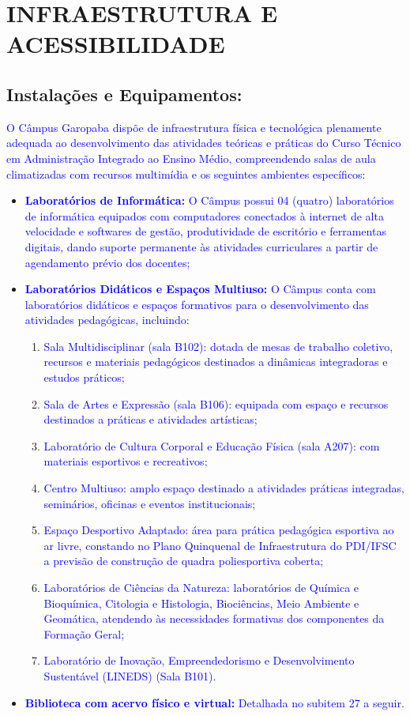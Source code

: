 \documentclass{../../modelos/latex-shared/ifsc-ppc}
\newcommand{\revisao}[1]{\textcolor{blue}{#1}}
\newcommand{\revisao}[1]{#1}
\begin{document}
\section{INFRAESTRUTURA E ACESSIBILIDADE}
\subsection{Instalações e Equipamentos:}
\revisao{O Câmpus Garopaba dispõe de infraestrutura física e tecnológica plenamente adequada ao desenvolvimento das atividades teóricas e práticas do Curso Técnico em Administração Integrado ao Ensino Médio, compreendendo salas de aula climatizadas com recursos multimídia e os seguintes ambientes específicos:}
\begin{itemize}
    \item \revisao{\textbf{Laboratórios de Informática:} O Câmpus possui 04 (quatro) laboratórios de informática equipados com computadores conectados à internet de alta velocidade e softwares de gestão, produtividade de escritório e ferramentas digitais, dando suporte permanente às atividades curriculares a partir de agendamento prévio dos docentes;}
    \item \revisao{\textbf{Laboratórios Didáticos e Espaços Multiuso:} O Câmpus conta com laboratórios didáticos e espaços formativos para o desenvolvimento das atividades pedagógicas, incluindo:}
    \begin{enumerate}
        \item \revisao{Sala Multidisciplinar (sala B102): dotada de mesas de trabalho coletivo, recursos e materiais pedagógicos destinados a dinâmicas integradoras e estudos práticos;}
        \item \revisao{Sala de Artes e Expressão (sala B106): equipada com espaço e recursos destinados a práticas e atividades artísticas;}
        \item \revisao{Laboratório de Cultura Corporal e Educação Física (sala A207): com materiais esportivos e recreativos;}
        \item \revisao{Centro Multiuso: amplo espaço destinado a atividades práticas integradas, seminários, oficinas e eventos institucionais;}
        \item \revisao{Espaço Desportivo Adaptado: área para prática pedagógica esportiva ao ar livre, constando no Plano Quinquenal de Infraestrutura do PDI/IFSC a previsão de construção de quadra poliesportiva coberta;}
        \item \revisao{Laboratórios de Ciências da Natureza: laboratórios de Química e Bioquímica, Citologia e Histologia, Biociências, Meio Ambiente e Geomática, atendendo às necessidades formativas dos componentes da Formação Geral;}
        \item \revisao{Laboratório de Inovação, Empreendedorismo e Desenvolvimento Sustentável (LINEDS) (Sala B101).}
    \end{enumerate}
    \item \revisao{\textbf{Biblioteca com acervo físico e virtual:} Detalhada no subitem 27 a seguir.}
\end{itemize}
\end{document}
